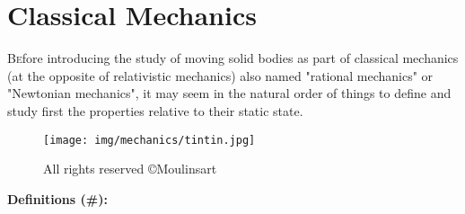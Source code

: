 	\newpage
	\thispagestyle{empty}
	\mbox{}
	\section{Classical Mechanics}
	
	\lettrine[lines=4]{\color{BrickRed}B}efore introducing the study of moving solid bodies as part of classical mechanics (at the opposite of relativistic mechanics) also named "rational mechanics" or "Newtonian mechanics", it may seem in the natural order of things to define and study first the properties relative to their static state.

	\begin{figure}[H]
		\centering
		\texttt{[image: img/mechanics/tintin.jpg]}
		\caption[]{All rights reserved ©Moulinsart}
	\end{figure}

\textbf{Definitions (\#\mydef):}

